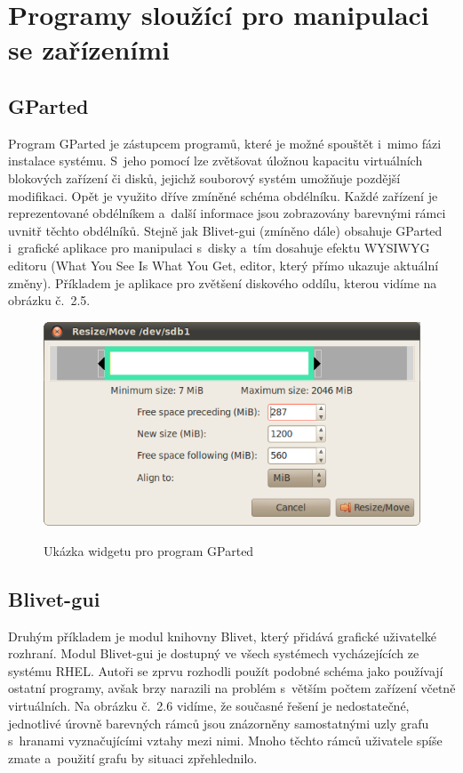 \documentclass[color,table,oneside,nolot,nolof]{fithesis}
\begin{document}
\pagebreak
\section{Programy sloužící pro manipulaci se zařízeními}

\subsection{GParted}
	Program GParted\cite{GParted} je zástupcem programů, které je možné spouštět i~mimo fázi instalace systému. S~jeho pomocí lze 
	zvětšovat úložnou kapacitu virtuálních blokových zařízení či disků, jejichž souborový systém umožňuje pozdější modifikaci. Opět je využito dříve zmíněné schéma obdélníku. Každé zařízení je reprezentované
	obdélníkem a~další informace jsou zobrazovány barevnými rámci uvnitř těchto obdélníků. Stejně jak Blivet-gui (zmíněno dále) obsahuje GParted i~grafické aplikace pro manipulaci s~disky 
	a~tím dosahuje efektu WYSIWYG editoru (What You See Is What You Get, editor, který přímo ukazuje aktuální změny). Příkladem je aplikace pro zvětšení diskového oddílu, kterou vidíme na obrázku č.~2.5.

 \begin{figure}[h!]
	 \label{fig:gparted}
	 \caption{Ukázka widgetu pro program GParted~\cite{GParted}}
	 \centering
	 \includegraphics[width=.8\columnwidth]{pictures/gparted-5-big.png}\\
 \end{figure}
 
 \pagebreak
 \subsection{Blivet-gui}

 Druhým příkladem je modul knihovny Blivet, který přidává grafické uživatelké rozhraní. Modul Blivet-gui je dostupný ve všech systémech vycházejících ze systému RHEL. Autoři 
 se zprvu rozhodli použít podobné schéma jako používají ostatní programy, avšak brzy narazili na problém s~větším počtem zařízení včetně virtuálních. Na obrázku č.~2.6 vidíme, že současné řešení je nedostatečné, jednotlivé úrovně 
 barevných rámců 
 jsou znázorněny samostatnými uzly grafu s~hranami vyznačujícími vztahy mezi nimi. Mnoho těchto rámců uživatele spíše zmate a~použití grafu by situaci zpřehlednilo.
\end{document}

